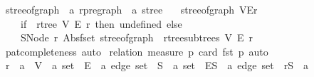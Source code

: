 \begin{isabellebody}
\isanewline
{}\isamarkupfalse%
\ stree{\isacharunderscore}{\kern0pt}of{\isacharunderscore}{\kern0pt}graph\ {\isacharcolon}{\kern0pt}{\isacharcolon}{\kern0pt}\ {\isachardoublequoteopen}{\isacharprime}{\kern0pt}a\ rpregraph\ {\isasymRightarrow}\ {\isacharprime}{\kern0pt}a\ stree{\isachardoublequoteclose}\ \isanewline
\ \ {\isachardoublequoteopen}stree{\isacharunderscore}{\kern0pt}of{\isacharunderscore}{\kern0pt}graph\ {\isacharparenleft}{\kern0pt}V{\isacharcomma}{\kern0pt}E{\isacharcomma}{\kern0pt}r{\isacharparenright}{\kern0pt}\ {\isacharequal}{\kern0pt}\isanewline
\ \ \ \ {\isacharparenleft}{\kern0pt}if\ {\isasymnot}\ rtree\ V\ E\ r\ then\ undefined\ else\isanewline
\ \ \ \ SNode\ r\ {\isacharparenleft}{\kern0pt}Abs{\isacharunderscore}{\kern0pt}fset\ {\isacharparenleft}{\kern0pt}stree{\isacharunderscore}{\kern0pt}of{\isacharunderscore}{\kern0pt}graph\ {\isacharbackquote}{\kern0pt}\ rtree{\isachardot}{\kern0pt}subtrees\ V\ E\ r{\isacharparenright}{\kern0pt}{\isacharparenright}{\kern0pt}{\isacharparenright}{\kern0pt}{\isachardoublequoteclose}\isanewline
%
\isadelimproof
\ \ %
\endisadelimproof
%
\isatagproof
{}\isamarkupfalse%
\ pat{\isacharunderscore}{\kern0pt}completeness\ auto%
\endisatagproof
{\isafoldproof}%
%
\isadelimproof
\isanewline
%
\endisadelimproof
\isanewline
{}\isamarkupfalse%
\isanewline
%
\isadelimproof
%
\endisadelimproof
%
\isatagproof
{}\isamarkupfalse%
\ {\isacharparenleft}{\kern0pt}relation\ {\isachardoublequoteopen}measure\ {\isacharparenleft}{\kern0pt}{\isasymlambda}p{\isachardot}{\kern0pt}\ card\ {\isacharparenleft}{\kern0pt}fst\ p{\isacharparenright}{\kern0pt}{\isacharparenright}{\kern0pt}{\isachardoublequoteclose}{\isacharcomma}{\kern0pt}\ auto{\isacharparenright}{\kern0pt}\isanewline
\ \ \isamarkupfalse%
\ r\ {\isacharcolon}{\kern0pt}{\isacharcolon}{\kern0pt}\ {\isacharprime}{\kern0pt}a\ \ V\ {\isacharcolon}{\kern0pt}{\isacharcolon}{\kern0pt}\ {\isachardoublequoteopen}{\isacharprime}{\kern0pt}a\ set{\isachardoublequoteclose}\ \ E\ {\isacharcolon}{\kern0pt}{\isacharcolon}{\kern0pt}\ {\isachardoublequoteopen}{\isacharprime}{\kern0pt}a\ edge\ set{\isachardoublequoteclose}\ \ S\ {\isacharcolon}{\kern0pt}{\isacharcolon}{\kern0pt}\ {\isachardoublequoteopen}{\isacharprime}{\kern0pt}a\ set{\isachardoublequoteclose}\ \ E\isactrlsub S\ {\isacharcolon}{\kern0pt}{\isacharcolon}{\kern0pt}\ {\isachardoublequoteopen}{\isacharprime}{\kern0pt}a\ edge\ set{\isachardoublequoteclose}\ \ r\isactrlsub S\ {\isacharcolon}{\kern0pt}{\isacharcolon}{\kern0pt}\ {\isacharprime}{\kern0pt}a\isanewline

\end{isabellebody}

